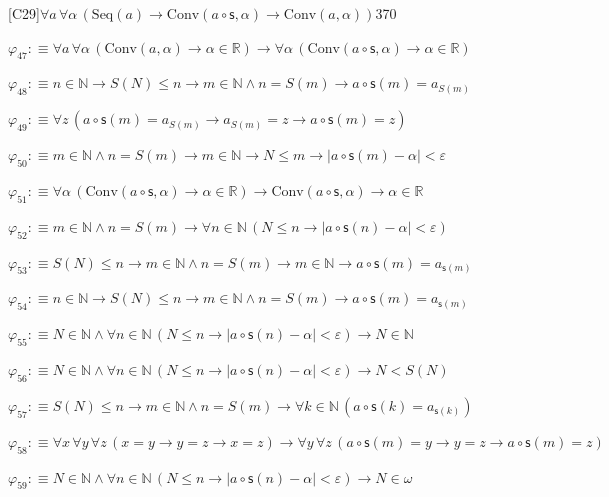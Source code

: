 \begin{fullproof}{[C29]}{$\forall a\,\forall \alpha\,(\mathrm{Seq}(a) \to \mathrm{Conv}(a \circ \mathsf{s},\alpha) \to \mathrm{Conv}(a,\alpha))$}{370}
\begin{abbrevlist}
\item $\varphi_{47} :\equiv \forall a\,\forall \alpha\,(\mathrm{Conv}(a,\alpha) \to \alpha \in \mathbb{R}) \to \forall \alpha\,(\mathrm{Conv}(a \circ \mathsf{s},\alpha) \to \alpha \in \mathbb{R})$
\item $\varphi_{48} :\equiv n \in \mathbb{N} \to S(N) \leq n \to m \in \mathbb{N} \land n = S(m) \to a \circ \mathsf{s}(m) = a_{S(m)}$
\item $\varphi_{49} :\equiv \forall z\,(a \circ \mathsf{s}(m) = a_{S(m)} \to a_{S(m)} = z \to a \circ \mathsf{s}(m) = z)$
\item $\varphi_{50} :\equiv m \in \mathbb{N} \land n = S(m) \to m \in \mathbb{N} \to N \leq m \to \lvert a \circ \mathsf{s}(m) - \alpha \rvert < \varepsilon$
\item $\varphi_{51} :\equiv \forall \alpha\,(\mathrm{Conv}(a \circ \mathsf{s},\alpha) \to \alpha \in \mathbb{R}) \to \mathrm{Conv}(a \circ \mathsf{s},\alpha) \to \alpha \in \mathbb{R}$
\item $\varphi_{52} :\equiv m \in \mathbb{N} \land n = S(m) \to \forall n \in \mathbb{N}\,(N \leq n \to \lvert a \circ \mathsf{s}(n) - \alpha \rvert < \varepsilon)$
\item $\varphi_{53} :\equiv S(N) \leq n \to m \in \mathbb{N} \land n = S(m) \to m \in \mathbb{N} \to a \circ \mathsf{s}(m) = a_{\mathsf{s}(m)}$
\item $\varphi_{54} :\equiv n \in \mathbb{N} \to S(N) \leq n \to m \in \mathbb{N} \land n = S(m) \to a \circ \mathsf{s}(m) = a_{\mathsf{s}(m)}$
\item $\varphi_{55} :\equiv N \in \mathbb{N} \land \forall n \in \mathbb{N}\,(N \leq n \to \lvert a \circ \mathsf{s}(n) - \alpha \rvert < \varepsilon) \to N \in \mathbb{N}$
\item $\varphi_{56} :\equiv N \in \mathbb{N} \land \forall n \in \mathbb{N}\,(N \leq n \to \lvert a \circ \mathsf{s}(n) - \alpha \rvert < \varepsilon) \to N < S(N)$
\item $\varphi_{57} :\equiv S(N) \leq n \to m \in \mathbb{N} \land n = S(m) \to \forall k \in \mathbb{N}\,(a \circ \mathsf{s}(k) = a_{\mathsf{s}(k)})$
\item $\varphi_{58} :\equiv \forall x\,\forall y\,\forall z\,(x = y \to y = z \to x = z) \to \forall y\,\forall z\,(a \circ \mathsf{s}(m) = y \to y = z \to a \circ \mathsf{s}(m) = z)$
\item $\varphi_{59} :\equiv N \in \mathbb{N} \land \forall n \in \mathbb{N}\,(N \leq n \to \lvert a \circ \mathsf{s}(n) - \alpha \rvert < \varepsilon) \to N \in \omega$

\end{abbrevlist}
\end{fullproof}
